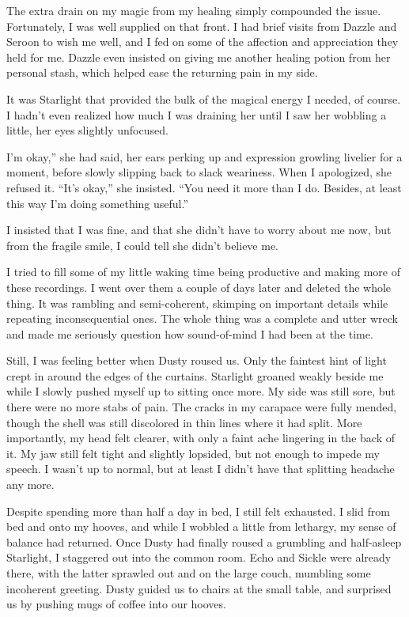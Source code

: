 The extra drain on my magic from my healing simply compounded the issue. Fortunately, I was well supplied on that front. I had brief visits from Dazzle and Seroon to wish me well, and I fed on some of the affection and appreciation they held for me. Dazzle even insisted on giving me another healing potion from her personal stash, which helped ease the returning pain in my side.

It was Starlight that provided the bulk of the magical energy I needed, of course. I hadn’t even realized how much I was draining her until I saw her wobbling a little, her eyes slightly unfocused.

\leavevmode{}I’m okay,” she had said, her ears perking up and expression growling livelier for a moment, before slowly slipping back to slack weariness. When I apologized, she refused it. “It’s okay,” she insisted. “You need it more than I do. Besides, at least this way I’m doing something useful.”

I insisted that I was fine, and that she didn’t have to worry about me now, but from the fragile smile, I could tell she didn’t believe me.

I tried to fill some of my little waking time being productive and making more of these recordings. I went over them a couple of days later and deleted the whole thing. It was rambling and semi-coherent, skimping on important details while repeating inconsequential ones. The whole thing was a complete and utter wreck and made me seriously question how sound-of-mind I had been at the time.

Still, I was feeling better when Dusty roused us. Only the faintest hint of light crept in around the edges of the curtains. Starlight groaned weakly beside me while I slowly pushed myself up to sitting once more. My side was still sore, but there were no more stabs of pain. The cracks in my carapace were fully mended, though the shell was still discolored in thin lines where it had split. More importantly, my head felt clearer, with only a faint ache lingering in the back of it. My jaw still felt tight and slightly lopsided, but not enough to impede my speech. I wasn’t up to normal, but at least I didn’t have that splitting headache any more.

Despite spending more than half a day in bed, I still felt exhausted. I slid from bed and onto my hooves, and while I wobbled a little from lethargy, my sense of balance had returned. Once Dusty had finally roused a grumbling and half-asleep Starlight, I staggered out into the common room. Echo and Sickle were already there, with the latter sprawled out and on the large couch, mumbling some incoherent greeting. Dusty guided us to chairs at the small table, and surprised us by pushing mugs of coffee into our hooves.

